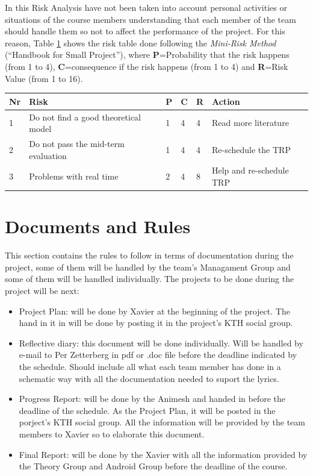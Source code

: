 \documentclass[11pt]{article}
\begin{document}
In this Risk Analysis have not been taken into account personal activities or situations of the course members understanding that each member of the team should handle them so not to affect the performance of the project. For this reason, Table \ref{tablerisk} shows the risk table done following the \textit{Mini-Risk Method} (``Handbook for Small Project''), where \textbf{P}=Probability that the risk happens (from 1 to 4), \textbf{C}=consequence if the risk happens (from 1 to 4) and \textbf{R}=Risk Value (from 1 to 16).


\begin{table}[h]
\label{tablerisk}
\centering
\begin{tabular}{l| l| l| l| l| l}
 Nr &Risk  &P  &C  &R &Action  \\
 \hline
 1 & Do not find a good theoretical model & 1 & 4 & 4 & Read more literature\\
 2 & Do not pass the mid-term evaluation & 1 & 4 & 4 & Re-schedule the TRP\\
 3 & Problems with real time & 2 & 4 & 8 & Help and re-schedule TRP \\
\end{tabular}
\end{table}



\section{Documents and Rules}
This section contains the rules to follow in terms of documentation during the project, some of them will be handled by the team's Managament Group and some of them will be handled individually. The projects to be done during the project will be next:

\begin{itemize}
\item Project Plan: will be done by Xavier at the beginning of the project. The hand in it in will be done by posting it in the project's KTH social group.

\item Reflective diary: this document will be done individually. Will be handled by e-mail to Per Zetterberg in pdf or .doc file before the deadline indicated by the schedule. Should include all what each team member has done in a schematic way with all the documentation needed to suport the lyrics.

\item Progress Report: will be done by the Animesh and handed in before the deadline of the schedule. As the Project Plan, it will be posted in the porject's KTH social group.  All the information will be provided by the team members to Xavier so to elaborate this document.

\item Final Report: will be done by the Xavier with all the information provided by the Theory Group and Android Group before the deadline of the course.
\end{itemize}
\end{document}
